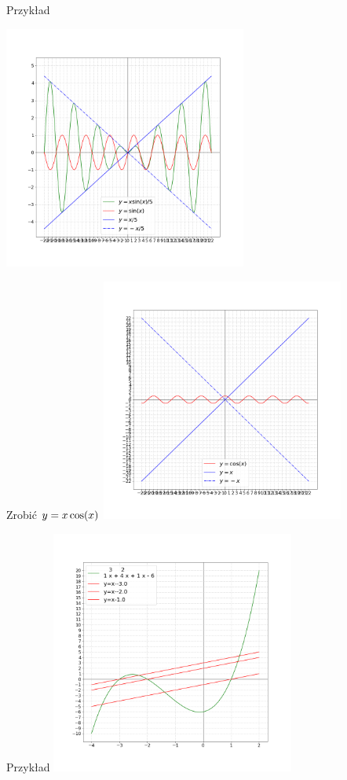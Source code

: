 \documentclass[]{letter}
\begin{document}
Przykład

\includegraphics[width=8cm,height=8cm]{pics/graph_mult_1.png}
\newline

Zrobić $\Large y = x\cos(x)$
\includegraphics[width=8cm,height=8cm]{pics/graph_mult_2.png}

Przykład
\includegraphics[width=8cm,height=8cm]{pics/graph_mult_3.png}
\newline
\end{document}
